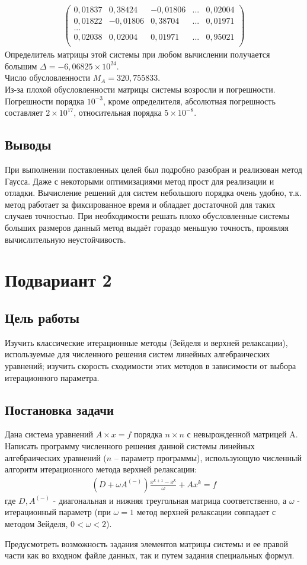 \documentclass[a4paper,12pt,titlepage,finall]{article}
\begin{document}
\begin{enumerate}
\begin{align*}
\begin{pmatrix}
	0,01837&     0,38424&    -0,01806& ... &     0,02004 \\
	0,01822&    -0,01806&     0,38704& ... &     0,01971 \\
	...\\
	0,02038&     0,02004&     0,01971& ... &     0,95021 \\
\end{pmatrix}
\end{align*}
Определитель матрицы этой системы при любом вычислении получается большим $\Delta = -6,06825 \times 10^{24}$.\\
Число обусловленности $M_A = 320,755833$.\\
Из-за плохой обусловленности матрицы системы возросли и погрешности. Погрешности порядка $10^{-3}$, кроме определителя, абсолютная погрешность составляет $2 \times 10^{17}$, относительная порядка $5 \times 10^{-8}$.
\end{enumerate}
\subsection{Выводы}
При выполнении поставленных целей был подробно разобран и реализован метод Гаусса. Даже с некоторыми оптимизациями метод прост для реализации и отладки. Вычисление решений для систем небольшого порядка очень удобно, т.к. метод работает за фиксированное время и обладает достаточной для таких случаев точностью. При необходимости решать плохо обусловленные системы больших размеров данный метод выдаёт гораздо меньшую точность, проявляя вычислительную неустойчивость.

\newpage
\section{Подвариант 2}
\subsection{Цель работы}
Изучить классические итерационные методы (Зейделя и верхней релаксации),
используемые для численного решения систем линейных алгебраических уравнений;
изучить скорость сходимости этих методов в зависимости от выбора итерационного
параметра.
\subsection{Постановка задачи}
Дана система уравнений $A \times x=f$ порядка $n \times n$ с невырожденной матрицей A. Написать
программу численного решения данной системы линейных алгебраических уравнений
($n$ – параметр программы), использующую численный алгоритм итерационного метода
верхней релаксации:
\begin{align*}
(D + \omega A^{(-)})\frac{x^{k+1}-x^k}{\omega} + Ax^k = f
\end{align*}
где $D, A^{(-)}$ - диагональная и нижняя треугольная матрица соответственно, а $\omega$ - итерационный параметр (при $\omega = 1$ метод верхней релаксации совпадает с методом Зейделя, $0 < \omega < 2$).
\par
Предусмотреть возможность задания элементов матрицы системы и ее правой части как
во входном файле данных, так и путем задания специальных формул.
\end{document}
